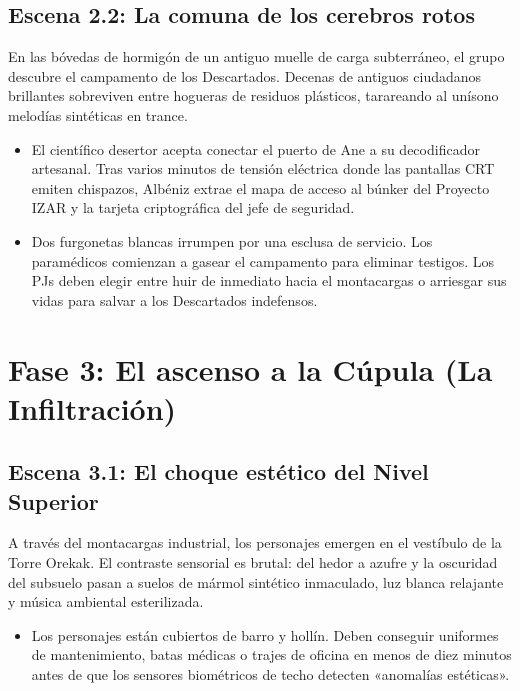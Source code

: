\subsection{Escena 2.2: La comuna de los cerebros rotos}
En las bóvedas de hormigón de un antiguo muelle de carga subterráneo, el grupo descubre el campamento de los Descartados. Decenas de antiguos ciudadanos brillantes sobreviven entre hogueras de residuos plásticos, tarareando al unísono melodías sintéticas en trance.
\begin{itemize}
  \item {} El científico desertor acepta conectar el puerto de Ane a su decodificador artesanal. Tras varios minutos de tensión eléctrica donde las pantallas CRT emiten chispazos, Albéniz extrae el mapa de acceso al búnker del Proyecto IZAR y la tarjeta criptográfica del jefe de seguridad.
  \item {} Dos furgonetas blancas irrumpen por una esclusa de servicio. Los paramédicos comienzan a gasear el campamento para eliminar testigos. Los PJs deben elegir entre huir de inmediato hacia el montacargas o arriesgar sus vidas para salvar a los Descartados indefensos.
\end{itemize}

\section{Fase 3: El ascenso a la Cúpula (La Infiltración)}


\subsection{Escena 3.1: El choque estético del Nivel Superior}
A través del montacargas industrial, los personajes emergen en el vestíbulo de la Torre Orekak. El contraste sensorial es brutal: del hedor a azufre y la oscuridad del subsuelo pasan a suelos de mármol sintético inmaculado, luz blanca relajante y música ambiental esterilizada.
\begin{itemize}
  \item {} Los personajes están cubiertos de barro y hollín. Deben conseguir uniformes de mantenimiento, batas médicas o trajes de oficina en menos de diez minutos antes de que los sensores biométricos de techo detecten «anomalías estéticas».
\end{itemize}

